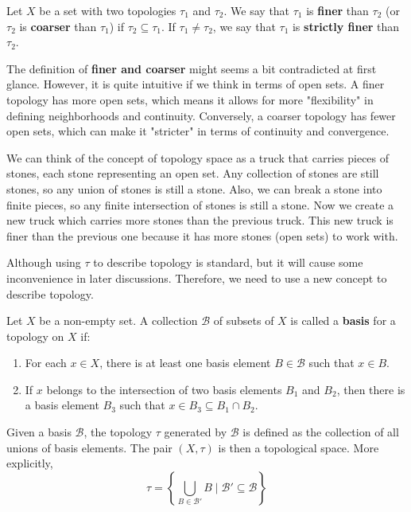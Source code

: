 \begin{definition}
Let $X$ be a set with two topologies $\tau_1$ and $\tau_2$. We say that $\tau_1$ is \textbf{finer} than $\tau_2$ (or $\tau_2$ is \textbf{coarser} than $\tau_1$) if $\tau_2 \subseteq \tau_1$. If $\tau_1 \ne \tau_2$, we say that $\tau_1$ is \textbf{strictly finer} than $\tau_2$.
\end{definition}

The definition of \textbf{finer and coarser} might seems a bit contradicted at first glance. However, it is quite intuitive if we think in terms of open sets. A finer topology has more open sets, which means it allows for more "flexibility" in defining neighborhoods and continuity. Conversely, a coarser topology has fewer open sets, which can make it "stricter" in terms of continuity and convergence.

We can think of the concept of topology space as a truck that carries pieces of stones, each stone representing an open set. Any collection of stones are still stones, so any union of stones is still a stone. Also, we can break a stone into finite pieces, so any finite intersection of stones is still a stone. Now we create a new truck which carries more stones than the previous truck. This new truck is finer than the previous one because it has more stones (open sets) to work with.

Although using $\tau$ to describe topology is standard, but it will cause some inconvenience in later discussions. Therefore, we need to use a new concept to describe topology.

\begin{definition}
Let $X$ be a non-empty set. A collection $\mathcal{B}$ of subsets of $X$ is called a \textbf{basis} for a topology on $X$ if:
\begin{enumerate}
    \item For each $x \in X$, there is at least one basis element $B \in \mathcal{B}$ such that $x \in B$.
    \item If $x$ belongs to the intersection of two basis elements $B_1$ and $B_2$, then there is a basis element $B_3$ such that $x \in B_3 \subseteq B_1 \cap B_2$.
\end{enumerate}
Given a basis $\mathcal{B}$, the topology $\tau$ generated by $\mathcal{B}$ is defined as the collection of all unions of basis elements. The pair $(X, \tau)$ is then a topological space. More explicitly,
\[
\tau = \left\{ \bigcup_{B \in \mathcal{B'}} B \mid \mathcal{B'} \subseteq \mathcal{B} \right\}
\]
\end{definition}


